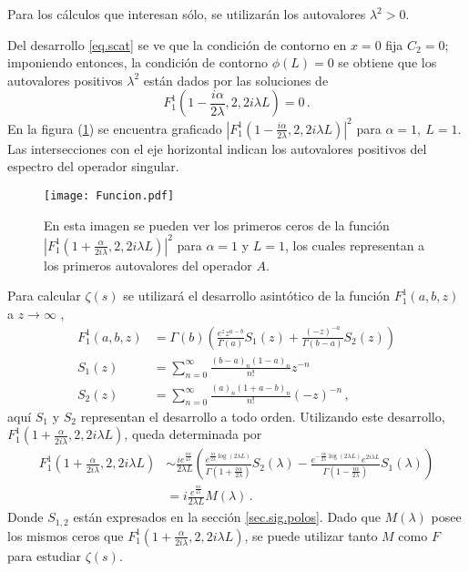 Para los cálculos que interesan sólo, se utilizarán los autovalores $\lambda ^2 >0$. 

Del desarrollo \ref{eq.scat} se ve que la condición de contorno en $x=0$ fija $C _2 =0$;
imponiendo entonces, la condición de contorno $\phi (L)=0$ se obtiene que los autovalores positivos $\lambda ^2$ están dados por las soluciones de
\begin{equation}
F _1 ^1 \left(1-\frac{i \alpha}{2 \lambda},2,2 i \lambda L \right)  = 0
	\, .
\label{eq.1}
\end{equation}
En la figura (\ref{fig:funcion}) se encuentra graficado
\mbox{$ | F _1 ^1 (1-\frac{i \alpha}{2 \lambda},2,2 i \lambda L) | ^2 $} para $\alpha=1, \ L=1$. Las intersecciones con el eje horizontal indican los autovalores positivos del espectro del operador singular.


\begin{figure}[h!]
\centering
\texttt{[image: Funcion.pdf]}
\caption{En esta imagen se pueden ver los primeros ceros de la función $| F _1 ^1 (1+\frac{ \alpha}{2 i \lambda},2,2 i \lambda L) | ^2$ para $\alpha=1$ y $L=1$, los cuales representan a los primeros autovalores del operador $A$.}
\label{fig:funcion}
\end{figure}


Para calcular $\zeta(s)$ se utilizará el desarrollo asintótico de la función $F _1 ^1 (a,b,z)$ a $z \rightarrow \infty$ \cite{Abramowitz:hyper},
\begin{equation}
\begin{aligned}
    F _1 ^1 (a,b,z) &= \Gamma (b) 
    \left(
    \frac{e^z z ^{a-b} }{\Gamma(a)}  S_1 (z) + \frac{(-z) ^{ -a}}{ \Gamma(b-a)} 
    S_2 (z)
    \right) \\[5pt]
    S _1 (z) &= \sum _{n=0} ^{\infty} \frac{(b-a) _n (1-a) _n}{n!} z ^{-n} \\[5pt]
    S _2 (z) &= \sum _{n=0} ^{\infty} \frac{(a) _n (1+a-b) _n}{n!} (-z) ^{-n}     
		\, ,
\end{aligned}
\label{eq.aprox}
\end{equation}
aquí $S_1$ y $S _2$ representan el desarrollo a todo orden.
Utilizando este desarrollo, $F _1 ^1 \left(1+  \frac{  \alpha}{2 i \lambda} ,2 ,2 i \lambda L  \right)$, queda determinada por
\begin{align}
\label{eq.completa}
	F _1 ^1 \left(1+  \frac{  \alpha}{2 i \lambda} ,2 ,2 i \lambda L  \right) 
&	
	\sim
    \frac{i e ^{ \frac{\pi \alpha }{4 \lambda}  } }{2 \lambda L}
    \left(
    \frac{e ^{   \frac{ i \alpha}{2 \lambda}  \log (2 \lambda L) }}               {\Gamma(1+\frac{i \alpha}{2 \lambda})} S _2 ( \lambda )-
    \frac{e ^{-  \frac{i \alpha}{2 \lambda}  \log (2 \lambda L) } e ^{2 i \lambda L} }{\Gamma(1-\frac{i \alpha}{2 \lambda})} 
    S _1 ( \lambda )
    \right) 
\nonumber
\\[5pt]
&
    =  i  \frac{e ^{ \frac{\pi \alpha }{4 \lambda}  } }{2 \lambda L}     M (\lambda) 
    \, .
\end{align}
Donde $S _{1,2}$ están expresados en la sección \ref{sec.sig.polos}.
Dado que $M( \lambda)$ posee los mismos ceros que $F _1 ^1 \left(1+  \frac{  \alpha}{2 i \lambda} ,2 ,2 i \lambda L  \right)$, se puede utilizar tanto $M$ como $F$ para estudiar $\zeta (s)$.


